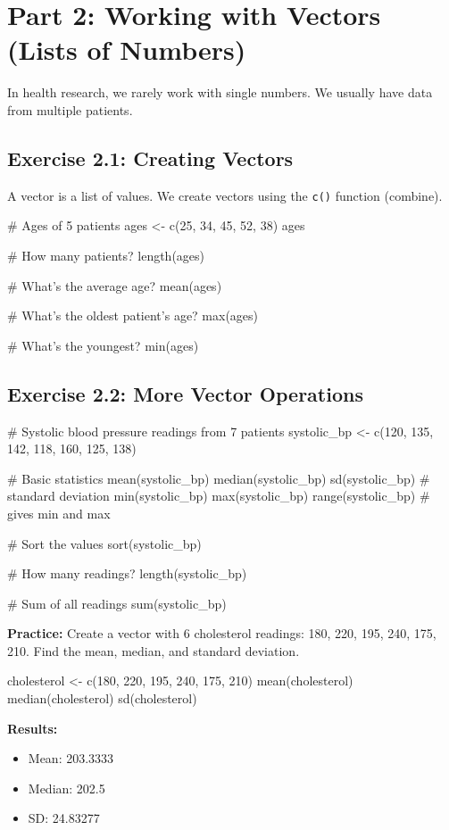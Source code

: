 \documentclass[11pt]{article}
\begin{document}
\section{Part 2: Working with Vectors (Lists of Numbers)}

In health research, we rarely work with single numbers. We usually have data from multiple patients.

\subsection{Exercise 2.1: Creating Vectors}

A vector is a list of values. We create vectors using the \texttt{c()} function (combine).

\begin{rcode}
# Ages of 5 patients
ages <- c(25, 34, 45, 52, 38)
ages

# How many patients?
length(ages)

# What's the average age?
mean(ages)

# What's the oldest patient's age?
max(ages)

# What's the youngest?
min(ages)
\end{rcode}

\subsection{Exercise 2.2: More Vector Operations}

\begin{rcode}
# Systolic blood pressure readings from 7 patients
systolic_bp <- c(120, 135, 142, 118, 160, 125, 138)

# Basic statistics
mean(systolic_bp)
median(systolic_bp)
sd(systolic_bp)  # standard deviation
min(systolic_bp)
max(systolic_bp)
range(systolic_bp)  # gives min and max

# Sort the values
sort(systolic_bp)

# How many readings?
length(systolic_bp)

# Sum of all readings
sum(systolic_bp)
\end{rcode}

\textbf{Practice:} Create a vector with 6 cholesterol readings: 180, 220, 195, 240, 175, 210. Find the mean, median, and standard deviation.

\begin{answerbox}
\begin{rcode}
cholesterol <- c(180, 220, 195, 240, 175, 210)
mean(cholesterol)
median(cholesterol)
sd(cholesterol)
\end{rcode}

\textbf{Results:}
\begin{itemize}
\item Mean: 203.3333
\item Median: 202.5
\item SD: 24.83277
\end{itemize}
\end{answerbox}
\end{document}
